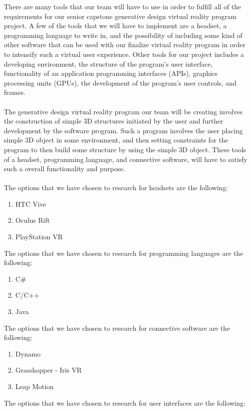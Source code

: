 \documentclass[letterpaper,10pt,onecolumn,compsoc]{IEEEtran}
\begin{document}
\noindent
There are many tools that our team will have to use in order to fulfill all of the requirements for our senior capstone generative design virtual reality program project. A few of the tools that we will have to implement are a headset, a programming language to write in, and the possibility of including some kind of other software that can be used with our finalize virtual reality program in order to intensify such a virtual user experience. Other tools for our project includes a developing environment, the structure of the program's user interface, functionality of an application programming interfaces (APIs), graphics processing units (GPUs), the development of the program's user controls, and frames.
\\ ~ \\ \noindent
The generative design virtual reality program our team will be creating involves the construction of simple 3D structures initiated by the user and further development by the software program. Such a program involves the user placing simple 3D object in some environment, and then setting constraints for the program to then build some structure by using the simple 3D object. These tools of a headset, programming language, and connective software, will have to satisfy such a overall functionality and purpose. 
\\ ~ \\
The options that we have chosen to research for headsets are the following:
\begin{enumerate}
 	\item HTC Vive
 	\item Oculus Rift
 	\item PlayStation VR
\end{enumerate}
\noindent
The options that we have chosen to research for programming languages are the following:
\begin{enumerate}
 	\item C\#
 	\item C/C++
 	\item Java
\end{enumerate}
\noindent
The options that we have chosen to research for connective software are the following:
\begin{enumerate}
 	\item Dynamo
 	\item Grasshopper - Iris VR
 	\item Leap Motion
\end{enumerate}
\noindent
The options that we have chosen to research for user interfaces are the following:
\end{document}
